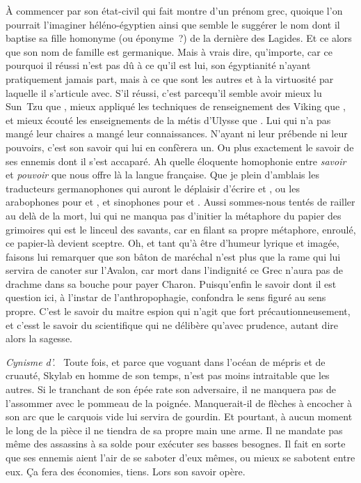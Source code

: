 À commencer par son état-civil qui fait montre d’un prénom grec, quoique l’on pourrait l’imaginer héléno-égyptien ainsi que semble le suggérer le nom dont il baptise sa fille homonyme (ou éponyme ?) de la dernière des Lagides. Et ce alors que son nom de famille est germanique. Mais à vrais dire, qu’importe, car ce pourquoi il réussi n’est pas dû à ce qu’il est lui, son égyptianité n’ayant pratiquement jamais part, mais à ce que sont les autres et à la virtuosité par laquelle il s’articule avec. S’il réussi, c’est parcequ’il semble avoir mieux lu Sun~Tzu que \reine, mieux appliqué les techniques de renseignement des Viking que \princesse, et mieux écouté les enseignements de la métis d’Ulysse que \general. Lui qui n’a pas mangé leur chaires a mangé leur connaissances. N’ayant ni leur prébende ni leur pouvoirs, c’est son savoir qui lui en confèrera un. Ou plus exactement le savoir de ses ennemis dont il s’est accaparé. Ah quelle éloquente homophonie entre \emph{savoir} et \emph{pouvoir} que nous offre là la langue française. Que je plein d’amblais les traducteurs germanophones qui auront le déplaisir d’écrire  et , ou les arabophones pour  et , et sinophones pour  et .
Aussi sommes-nous tentés de railler \general{} au delà de la mort, lui qui ne manqua pas d’initier la métaphore du papier des grimoires qui est le linceul des savants, car en filant sa propre métaphore, enroulé, ce papier-là devient sceptre. Oh, et tant qu’à être d’humeur lyrique et imagée, faisons lui remarquer que son bâton de maréchal n’est plus que la rame qui lui servira de canoter sur l’Avalon, car mort dans l’indignité ce Grec n’aura pas de drachme dans sa bouche pour payer Charon. %
Puisqu’enfin le {savoir} dont il est question ici, à l’instar de l’anthropophagie, confondra le sens figuré au sens propre. C’est le savoir du maitre espion qui n’agit que fort précautionneusement, et c’esst le savoir du scientifique qui ne délibère qu’avec prudence, autant dire alors la sagesse.

{\em\normalsize Cynisme d’\elena{}.}~
Toute fois, et parce que voguant dans l’océan de mépris et de cruauté, \elena{} Skylab en homme de son temps, n’est pas moins intraitable que les autres. Si le tranchant de son épée rate son adversaire, il ne manquera pas de l’assommer avec le pommeau de la poignée. Manquerait-il de flèches à encocher à son arc que le carquois vide lui servira de gourdin. Et pourtant, à aucun moment le long de la pièce il ne tiendra de sa propre main une arme. Il ne mandate pas même des assassins à sa solde pour exécuter ses basses besognes. Il fait en sorte que ses ennemis aient l’air de se saboter d’eux mêmes, ou mieux se sabotent entre eux. Ça fera des économies, tiens. Lors son savoir opère.


